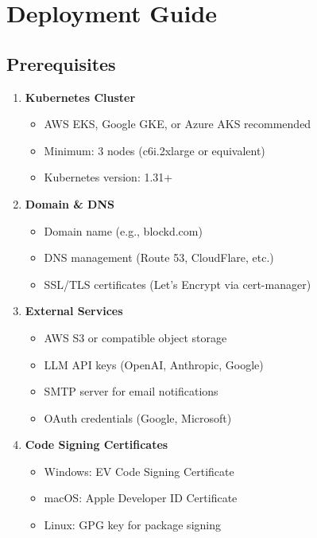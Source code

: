 \documentclass[11pt,letterpaper]{article}
\begin{document}

\section{Deployment Guide}

\subsection{Prerequisites}

\begin{enumerate}
    \item \textbf{Kubernetes Cluster}
    \begin{itemize}
        \item AWS EKS, Google GKE, or Azure AKS recommended
        \item Minimum: 3 nodes (c6i.2xlarge or equivalent)
        \item Kubernetes version: 1.31+
    \end{itemize}

    \item \textbf{Domain \& DNS}
    \begin{itemize}
        \item Domain name (e.g., blockd.com)
        \item DNS management (Route 53, CloudFlare, etc.)
        \item SSL/TLS certificates (Let's Encrypt via cert-manager)
    \end{itemize}

    \item \textbf{External Services}
    \begin{itemize}
        \item AWS S3 or compatible object storage
        \item LLM API keys (OpenAI, Anthropic, Google)
        \item SMTP server for email notifications
        \item OAuth credentials (Google, Microsoft)
    \end{itemize}

    \item \textbf{Code Signing Certificates}
    \begin{itemize}
        \item Windows: EV Code Signing Certificate
        \item macOS: Apple Developer ID Certificate
        \item Linux: GPG key for package signing
    \end{itemize}
\end{enumerate}
\end{document}
